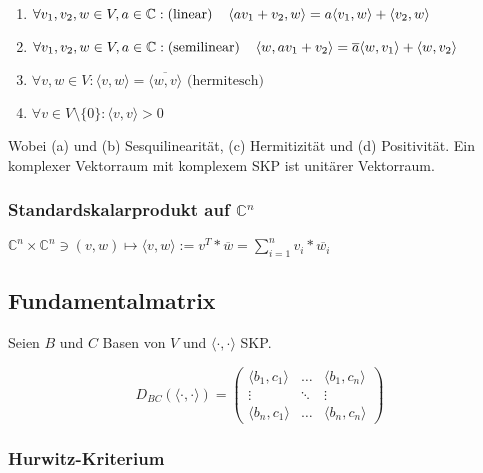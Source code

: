 \begin{enumerate}[label=(\alph*)]
	\item $\forall v_1, v_2, w \in V, a \in \mathbb{C} : \text{(linear)} \\ \hspace*{4mm} \langle av_1 + v_2, w \rangle = a \langle v_1, w \rangle + \langle v_2, w \rangle$
	\item $\forall v_1, v_2, w \in V, a \in \mathbb{C} : \text{(semilinear)} \\ \hspace*{4mm} \langle w, av_1 + v_2 \rangle = \overline a \langle w, v_1 \rangle + \langle w, v_2 \rangle$
	\item $\forall v, w \in V : \langle v, w \rangle = \overline{\langle w, v \rangle} \text{ (hermitesch)}$
	\item $\forall v \in V \setminus \{0\} : \langle v, v \rangle > 0$
\end{enumerate}

Wobei (a) und (b) Sesquilinearität, (c) Hermitizität und (d) Positivität. Ein komplexer Vektorraum mit komplexem SKP ist unitärer Vektorraum.

\subsubsection*{Standardskalarprodukt auf $\mathbb{C}^n$}

$\mathbb{C}^n \times \mathbb{C}^n \ni (v, w) \mapsto \langle v, w \rangle := v^T * \overline w = \sum_{i=1}^n v_i * \overline{w_i}$

\subsection*{Fundamentalmatrix}

Seien $B$ und $C$ Basen von $V$ und $\langle \cdot, \cdot \rangle$ SKP.

\vspace*{-3mm}
$$D_{BC}(\langle \cdot, \cdot \rangle) = \begin{pmatrix}
	\langle b_1, c_1 \rangle & \hdots & \langle b_1, c_n \rangle \\
	\vdots & \ddots & \vdots \\
	\langle b_n, c_1 \rangle & \hdots & \langle b_n, c_n \rangle
\end{pmatrix}$$

\subsubsection*{Hurwitz-Kriterium}

